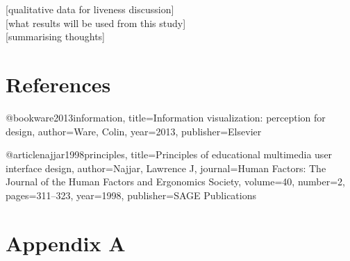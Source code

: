 \documentclass{article}
\begin{document}
[qualitative data for liveness discussion]\\

[what results will be used from this study]\\

[summarising thoughts]\\

\section{References}


@book{ware2013information,
  title={Information visualization: perception for design},
  author={Ware, Colin},
  year={2013},
  publisher={Elsevier}
}

@article{najjar1998principles,
  title={Principles of educational multimedia user interface design},
  author={Najjar, Lawrence J},
  journal={Human Factors: The Journal of the Human Factors and Ergonomics Society},
  volume={40},
  number={2},
  pages={311--323},
  year={1998},
  publisher={SAGE Publications}
}

\section{Appendix A}
\end{document}
